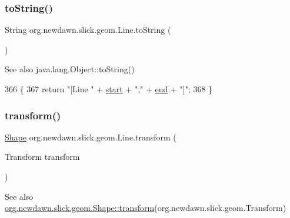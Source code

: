 \subsubsection{\texorpdfstring{to\+String()}{toString()}}
{\footnotesize\ttfamily String org.\+newdawn.\+slick.\+geom.\+Line.\+to\+String (\begin{DoxyParamCaption}{ }\end{DoxyParamCaption})\hspace{0.3cm}{\ttfamily [inline]}}

\begin{DoxySeeAlso}{See also}
java.\+lang.\+Object\+::to\+String() 
\end{DoxySeeAlso}

\begin{DoxyCode}
366                              \{
367         \textcolor{keywordflow}{return} \textcolor{stringliteral}{"[Line "} + \mbox{\hyperlink{classorg_1_1newdawn_1_1slick_1_1geom_1_1_line_aaf3a6c6053990b96a501b80081258f92}{start}} + \textcolor{stringliteral}{","} + \mbox{\hyperlink{classorg_1_1newdawn_1_1slick_1_1geom_1_1_line_abc89f3da558e2d29ad48f3c453c25f92}{end}} + \textcolor{stringliteral}{"]"};
368     \}
\end{DoxyCode}
\mbox{\label{classorg_1_1newdawn_1_1slick_1_1geom_1_1_line_ac7cb16775d1be4787856682155e872e4}} 
\subsubsection{\texorpdfstring{transform()}{transform()}}
{\footnotesize\ttfamily \mbox{\hyperlink{classorg_1_1newdawn_1_1slick_1_1geom_1_1_shape}{Shape}} org.\+newdawn.\+slick.\+geom.\+Line.\+transform (\begin{DoxyParamCaption}\item[{Transform}]{transform }\end{DoxyParamCaption})\hspace{0.3cm}{\ttfamily [inline]}}

\begin{DoxySeeAlso}{See also}
\mbox{\hyperlink{classorg_1_1newdawn_1_1slick_1_1geom_1_1_shape_a463826a085479c379e40f012e970b997}{org.\+newdawn.\+slick.\+geom.\+Shape\+::transform}}(org.\+newdawn.\+slick.\+geom.\+Transform) 
\end{DoxySeeAlso}


